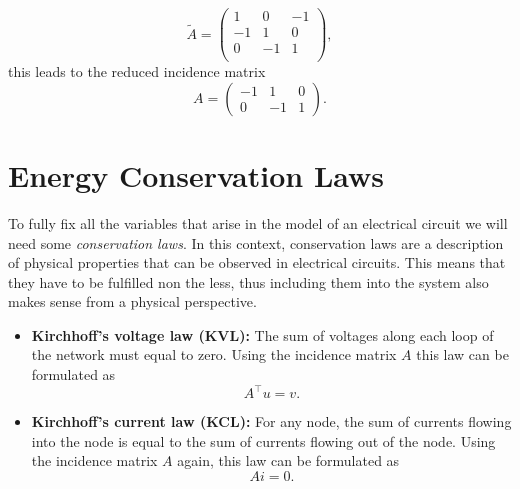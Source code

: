 \begin{displaymath}
	\tilde{A} = 
	\left(
	\begin{matrix}
		1 & 0 & -1 \\
		-1 & 1 & 0 \\
		0 & -1 & 1 \\
	\end{matrix}
	\right),
\end{displaymath}
this leads to the reduced incidence matrix
\begin{displaymath}
	A = 
	\left(
	\begin{matrix}
		-1 & 1 & 0 \\
		0 & -1 & 1 
	\end{matrix}
	\right).
\end{displaymath}



\section{Energy Conservation Laws}
To fully fix all the variables that arise in the model of an electrical circuit we will need some \emph{conservation laws}. In this context, conservation laws are a description of physical properties that can be observed in electrical circuits. This means that they have to be fulfilled non the less, thus including them into the system also makes sense from a physical perspective. 
\begin{itemize}
	\item \textbf{Kirchhoff's voltage law (KVL):} \newline
	The sum of voltages along each loop of the network must equal to zero. Using the incidence matrix $A$ this law can be formulated as
	\begin{equation}
		\label{KVL}
		A^\top  u = v.
	\end{equation}
	\item \textbf{Kirchhoff's current law (KCL):} \newline
	For any node, the sum of currents flowing into the node is equal to the sum of currents flowing out of the node. Using the incidence matrix $A$ again, this law can be formulated as
	\begin{equation}
		\label{KCL}
		A  i = 0.
	\end{equation}
\end{itemize}

